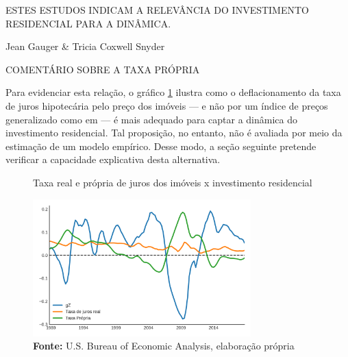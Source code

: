 ESTES ESTUDOS INDICAM A RELEVÂNCIA DO INVESTIMENTO RESIDENCIAL PARA A DINÂMICA.

Jean Gauger \& Tricia Coxwell Snyder

COMENTÁRIO SOBRE A TAXA PRÓPRIA

Para evidenciar esta relação, o gráfico \ref{gZ_Propria} ilustra como  o deflacionamento da taxa de juros hipotecária pelo preço dos imóveis --- e não por um índice de preços generalizado como em \textcite[p.~143--146]{fair_macroeconometric_2013} --- é mais adequado para captar a dinâmica do investimento residencial. Tal proposição, no entanto, não é avaliada por meio da estimação de um modelo empírico. Desse modo, a seção seguinte pretende verificar a capacidade explicativa desta alternativa.



\begin{figure}[H]
	\centering
	\caption{Taxa real e própria de juros dos imóveis x investimento residencial}
	\label{gZ_Propria}
	\includegraphics[width=0.75\textwidth]{Fatos_Estilizados/Figs/TxPropria_Investo.png}
	\caption*{\textbf{Fonte:} U.S. Bureau of Economic Analysis, elaboração própria}
\end{figure}
